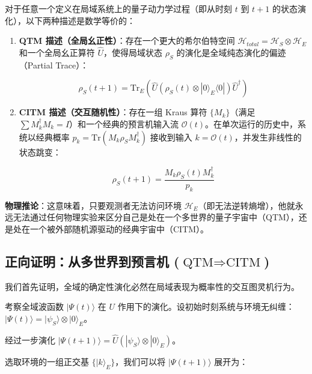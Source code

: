 \begin{theorem}
对于任意一个定义在局域系统上的量子动力学过程（即从时刻 $t$ 到 $t+1$ 的状态演化），以下两种描述是数学等价的：

\begin{enumerate}
\item \textbf{QTM 描述（全局幺正性）}：存在一个更大的希尔伯特空间 $\mathcal{H}_{total} = \mathcal{H}_S \otimes \mathcal{H}_E$ 和一个全局幺正算符 $\hat{U}$，使得局域状态 $\rho_S$ 的演化是全域纯态演化的偏迹（Partial Trace）：

\begin{equation}
\rho_S(t+1) = \text{Tr}_E \left( \hat{U} (\rho_S(t) \otimes |0\rangle_E \langle 0|) \hat{U}^\dagger \right)
\end{equation}

\item \textbf{CITM 描述（交互随机性）}：存在一组 Kraus 算符 $\{M_k\}$（满足 $\sum M_k^\dagger M_k = I$）和一个经典的预言机输入流 $\mathcal{O}(t)$。在单次运行的历史中，系统以经典概率 $p_k = \text{Tr}(M_k \rho_S M_k^\dagger)$ 接收到输入 $k = \mathcal{O}(t)$，并发生非线性的状态跳变：

\begin{equation}
\rho_S(t+1) = \frac{M_k \rho_S(t) M_k^\dagger}{p_k}
\end{equation}
\end{enumerate}
\end{theorem}

\textbf{物理推论}：这意味着，只要观测者无法访问环境 $\mathcal{H}_E$（即无法逆转熵增），他就永远无法通过任何物理实验来区分自己是处在一个多世界的量子宇宙中（QTM），还是处在一个被外部随机源驱动的经典宇宙中（CITM）。

\subsection{正向证明：从多世界到预言机 ($\text{QTM} \Rightarrow \text{CITM}$)}

我们首先证明，全域的确定性演化必然在局域表现为概率性的交互图灵机行为。

考察全域波函数 $|\Psi(t)\rangle$ 在 $U$ 作用下的演化。设初始时刻系统与环境无纠缠：$|\Psi(t)\rangle = |\psi_S\rangle \otimes |0\rangle_E$。

经过一步演化 $|\Psi(t+1)\rangle = \hat{U} (|\psi_S\rangle \otimes |0\rangle_E)$。

选取环境的一组正交基 $\{|k\rangle_E\}$，我们可以将 $|\Psi(t+1)\rangle$ 展开为：

